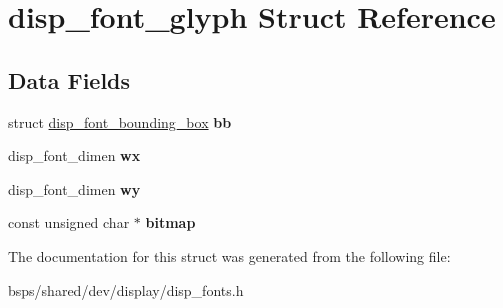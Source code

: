 \hypertarget{structdisp__font__glyph}{}\section{disp\+\_\+font\+\_\+glyph Struct Reference}
\label{structdisp__font__glyph}
\subsection*{Data Fields}
\begin{DoxyCompactItemize}
\item 
\mbox{\label{structdisp__font__glyph_a70ed5bcbed6e851b418d19d18afd5ae2}} 
struct \mbox{\hyperlink{structdisp__font__bounding__box}{disp\+\_\+font\+\_\+bounding\+\_\+box}} {\bfseries bb}
\item 
\mbox{\label{structdisp__font__glyph_a3dde365c7db2a3f01cb6fed6cd311c2c}} 
disp\+\_\+font\+\_\+dimen {\bfseries wx}
\item 
\mbox{\label{structdisp__font__glyph_a9c4e655d93765d7908d0da7d1e3aefef}} 
disp\+\_\+font\+\_\+dimen {\bfseries wy}
\item 
\mbox{\label{structdisp__font__glyph_a96a3b965f170f5a9410cd165a5797bc7}} 
const unsigned char $\ast$ {\bfseries bitmap}
\end{DoxyCompactItemize}


The documentation for this struct was generated from the following file\+:\begin{DoxyCompactItemize}
\item 
bsps/shared/dev/display/disp\+\_\+fonts.\+h\end{DoxyCompactItemize}
